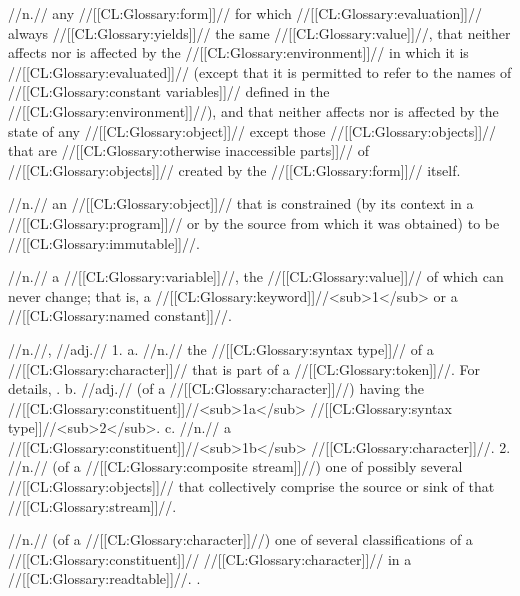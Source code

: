  //n.// any //[[CL:Glossary:form]]// for which //[[CL:Glossary:evaluation]]// always //[[CL:Glossary:yields]]// the same //[[CL:Glossary:value]]//, that neither affects nor is affected by the //[[CL:Glossary:environment]]// in which it is //[[CL:Glossary:evaluated]]// (except that it is permitted to refer to the names of //[[CL:Glossary:constant variables]]// defined in the //[[CL:Glossary:environment]]//), and that neither affects nor is affected by the state of any //[[CL:Glossary:object]]// except those //[[CL:Glossary:objects]]// that are //[[CL:Glossary:otherwise inaccessible parts]]// of //[[CL:Glossary:objects]]// created by the //[[CL:Glossary:form]]// itself. 

 //n.// an //[[CL:Glossary:object]]// that is constrained (\eg by its context in a //[[CL:Glossary:program]]// or by the source from which it was obtained) to be //[[CL:Glossary:immutable]]//. 

 //n.// a //[[CL:Glossary:variable]]//, the //[[CL:Glossary:value]]// of which can never change; that is, a //[[CL:Glossary:keyword]]//<sub>1</sub> or a //[[CL:Glossary:named constant]]//. 

 //n.//, //adj.// 1. a. //n.// the //[[CL:Glossary:syntax type]]// of a //[[CL:Glossary:character]]// that is part of a //[[CL:Glossary:token]]//. For details, \seesection\ConstituentChars. b. //adj.// (of a //[[CL:Glossary:character]]//) having the //[[CL:Glossary:constituent]]//<sub>1a</sub> //[[CL:Glossary:syntax type]]//<sub>2</sub>. c. //n.// a //[[CL:Glossary:constituent]]//<sub>1b</sub> //[[CL:Glossary:character]]//. 2. //n.// (of a //[[CL:Glossary:composite stream]]//) one of possibly several //[[CL:Glossary:objects]]// that collectively comprise the source or sink of that //[[CL:Glossary:stream]]//.

 //n.// (of a //[[CL:Glossary:character]]//) one of several classifications of a //[[CL:Glossary:constituent]]// //[[CL:Glossary:character]]// in a //[[CL:Glossary:readtable]]//. \Seesection\ConstituentChars.

